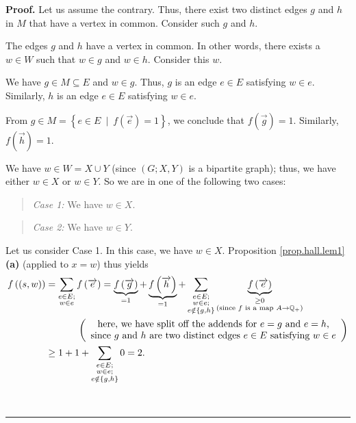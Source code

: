 \documentclass[numbers=enddot,12pt,final,onecolumn,notitlepage]{scrartcl}%
\theoremstyle{definition}
\newenvironment{statement}{\begin{quote}}{\end{quote}}
\newenvironment{proof}[1][Proof]{\noindent\textbf{#1.} }{\ \rule{0.5em}{0.5em}}
\let\sumnonlimits\sum
\renewcommand{\sum}{\sumnonlimits\limits}
\begin{document}
\begin{proof}
Let us assume the contrary. Thus, there exist two distinct edges $g$ and $h$
in $M$ that have a vertex in common. Consider such $g$ and $h$.

The edges $g$ and $h$ have a vertex in common. In other words, there exists a
$w\in W$ such that $w\in g$ and $w\in h$. Consider this $w$.

We have $g\in M\subseteq E$ and $w\in g$. Thus, $g$ is an edge $e\in E$
satisfying $w\in e$. Similarly, $h$ is an edge $e\in E$ satisfying $w\in e$.

From $g\in M=\left\{  e\in E\ \mid\ f\left(  \overrightarrow{e}\right)
=1\right\}  $, we conclude that $f\left(  \overrightarrow{g}\right)  =1$.
Similarly, $f\left(  \overrightarrow{h}\right)  =1$.

We have $w\in W=X\cup Y$ (since $\left(  G;X,Y\right)  $ is a bipartite
graph); thus, we have either $w\in X$ or $w\in Y$. So we are in one of the
following two cases:

\begin{statement}
\textit{Case 1:} We have $w\in X$.
\end{statement}

\begin{statement}
\textit{Case 2:} We have $w\in Y$.
\end{statement}

Let us consider Case 1. In this case, we have $w\in X$. Proposition
\ref{prop.hall.lem1} \textbf{(a)} (applied to $x=w$) thus yields%
\begin{align*}
f\left(  \left(  s,w\right)  \right)   &  =\sum_{\substack{e\in E;\\w\in
e}}f\left(  \overrightarrow{e}\right)  =\underbrace{f\left(
\overrightarrow{g}\right)  }_{=1}+\underbrace{f\left(  \overrightarrow{h}%
\right)  }_{=1}+\sum_{\substack{e\in E;\\w\in e;\\e\notin\left\{  g,h\right\}
}}\underbrace{f\left(  \overrightarrow{e}\right)  }_{\substack{\geq
0\\\text{(since }f\text{ is a map }A\rightarrow\mathbb{Q}_{+}\text{)}}}\\
&  \ \ \ \ \ \ \ \ \ \ \left(
\begin{array}
[c]{c}%
\text{here, we have split off the addends for }e=g\text{ and }e=h\text{,}\\
\text{since }g\text{ and }h\text{ are two distinct edges }e\in E\text{
satisfying }w\in e
\end{array}
\right) \\
&  \geq1+1+\sum_{\substack{e\in E;\\w\in e;\\e\notin\left\{  g,h\right\}
}}0=2.
\end{align*}



\end{proof}
\end{document}
